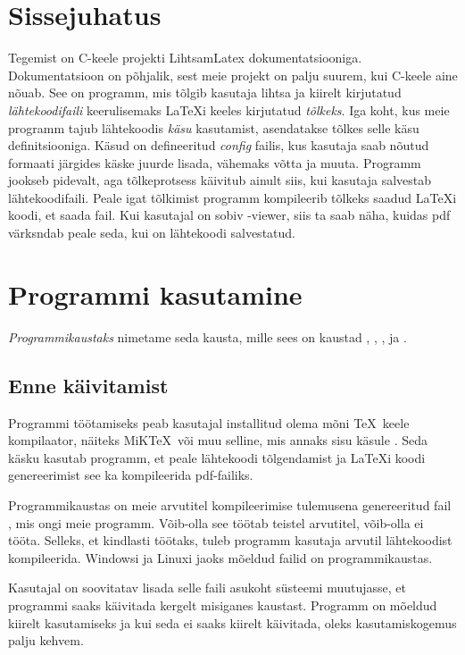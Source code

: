 \documentclass{article}
\begin{document}
\section*{Sissejuhatus}
Tegemist on C-keele projekti LihtsamLatex dokumentatsiooniga. Dokumentatsioon on põhjalik, sest meie projekt on palju suurem, kui C-keele aine nõuab. See on programm, mis tõlgib kasutaja lihtsa ja kiirelt kirjutatud \emph{lähtekoodifaili} keerulisemaks \LaTeX i keeles kirjutatud \emph{tõlkeks}. Iga koht, kus meie programm tajub lähtekoodis \emph{käsu} kasutamist, asendatakse tõlkes selle käsu definitsiooniga. Käsud on defineeritud \emph{config} failis, kus kasutaja saab nõutud formaati järgides käske juurde lisada, vähemaks võtta ja muuta. Programm jookseb pidevalt, aga tõlkeprotsess käivitub ainult siis, kui kasutaja salvestab lähtekoodifaili. Peale igat tõlkimist programm kompileerib tõlkeks saadud \LaTeX i koodi, et saada  fail. Kui kasutajal on sobiv -viewer, siis ta saab näha, kuidas pdf värksndab peale seda, kui on lähtekoodi salvestatud.



\section{Programmi kasutamine}
\emph{Programmikaustaks} nimetame seda kausta, mille sees on kaustad , , ,  ja .



\subsection{Enne käivitamist}
Programmi töötamiseks peab kasutajal installitud olema mõni \TeX\ keele kompilaator, näiteks MiK\TeX\ või muu selline, mis annaks sisu käsule . Seda käsku kasutab programm, et peale lähtekoodi tõlgendamist ja \LaTeX i koodi genereerimist see ka kompileerida pdf-failiks.

Programmikaustas on meie arvutitel kompileerimise tulemusena genereeritud fail , mis ongi meie programm. Võib-olla see töötab teistel arvutitel, võib-olla ei tööta. Selleks, et kindlasti töötaks, tuleb programm kasutaja arvutil lähtekoodist kompileerida. Windowsi ja Linuxi jaoks mõeldud  failid on programmikaustas.

Kasutajal on soovitatav lisada selle  faili asukoht süsteemi  muutujasse, et programmi saaks käivitada kergelt misiganes kaustast. Programm on mõeldud kiirelt kasutamiseks ja kui seda ei saaks kiirelt käivitada, oleks kasutamiskogemus palju kehvem.
\end{document}
